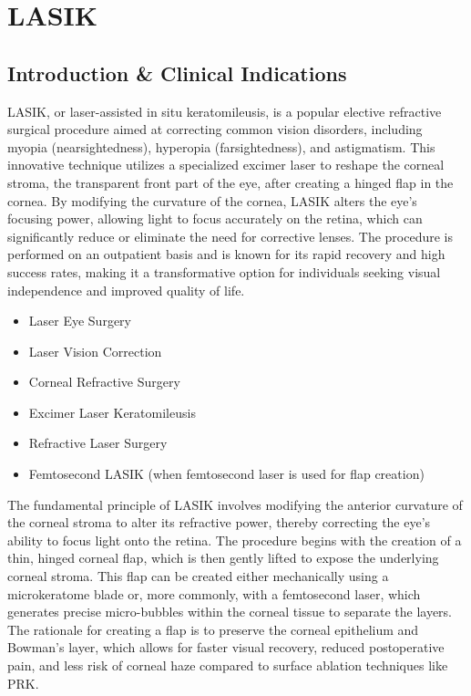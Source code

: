 \chapter{LASIK}

\section*{Introduction \& Clinical Indications}
LASIK, or laser-assisted in situ keratomileusis, is a popular elective refractive surgical procedure aimed at correcting common vision disorders, including myopia (nearsightedness), hyperopia (farsightedness), and astigmatism. This innovative technique utilizes a specialized excimer laser to reshape the corneal stroma, the transparent front part of the eye, after creating a hinged flap in the cornea. By modifying the curvature of the cornea, LASIK alters the eye's focusing power, allowing light to focus accurately on the retina, which can significantly reduce or eliminate the need for corrective lenses. The procedure is performed on an outpatient basis and is known for its rapid recovery and high success rates, making it a transformative option for individuals seeking visual independence and improved quality of life.

\begin{itemize}
  \item Laser Eye Surgery
  \item Laser Vision Correction
  \item Corneal Refractive Surgery
  \item Excimer Laser Keratomileusis
  \item Refractive Laser Surgery
  \item Femtosecond LASIK (when femtosecond laser is used for flap creation)
\end{itemize}

The fundamental principle of LASIK involves modifying the anterior curvature of the corneal stroma to alter its refractive power, thereby correcting the eye's ability to focus light onto the retina. The procedure begins with the creation of a thin, hinged corneal flap, which is then gently lifted to expose the underlying corneal stroma. This flap can be created either mechanically using a microkeratome blade or, more commonly, with a femtosecond laser, which generates precise micro-bubbles within the corneal tissue to separate the layers. The rationale for creating a flap is to preserve the corneal epithelium and Bowman's layer, which allows for faster visual recovery, reduced postoperative pain, and less risk of corneal haze compared to surface ablation techniques like PRK.

